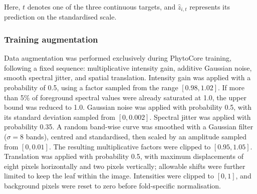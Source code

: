 \documentclass[11pt]{article}
\begin{document}
Here, $t$ denotes one of the three continuous targets, and
$\widehat{z}_{i,t}$ represents its prediction on the standardised scale.

\subsubsection{Training augmentation}
Data augmentation was performed exclusively during PhytoCore training, following
a fixed sequence: multiplicative intensity gain, additive Gaussian noise,
smooth spectral jitter, and spatial translation. Intensity gain was applied
with a probability of 0.5, using a factor sampled from the range
$[0.98,1.02]$. If more than 5\% of foreground spectral values were already
saturated at 1.0, the upper bound was reduced to 1.0. Gaussian noise was
applied with probability 0.5, with its standard deviation sampled from
$[0,0.002]$. Spectral jitter was applied with probability 0.35. A random
band-wise curve was smoothed with a Gaussian filter ($\sigma=8$ bands),
centred and standardised, then scaled by an amplitude sampled from
$[0,0.01]$. The resulting multiplicative factors were clipped to
$[0.95,1.05]$. Translation was applied with probability 0.5, with maximum
displacements of eight pixels horizontally and two pixels vertically;
allowable shifts were further limited to keep the leaf within the image.
Intensities were clipped to $[0,1]$, and background pixels were reset to zero
before fold-specific normalisation.
\end{document}
